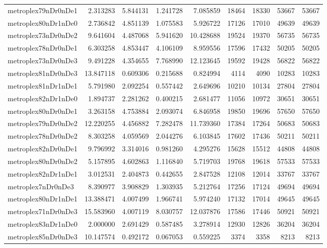 \begin{longtable}{|l|r|r|r|r|r|r|r|r|}
metroplex79nDr0nDe1 & 2.313283 & 5.844131 & 1.241728 & 7.085859 & 18464 & 18330 & 53667 & 53667 \\
metroplex80nDr1nDe0 & 2.736842 & 4.851139 & 1.075583 & 5.926722 & 17126 & 17010 & 49639 & 49639 \\
metroplex73nDr0nDe2 & 9.641604 & 4.487068 & 5.941620 & 10.428688 & 19524 & 19370 & 56735 & 56735 \\
metroplex78nDr0nDe1 & 6.303258 & 4.853447 & 4.106109 & 8.959556 & 17596 & 17432 & 50205 & 50205 \\
metroplex73nDr0nDe3 & 9.491228 & 4.354655 & 7.768990 & 12.123645 & 19592 & 19428 & 56822 & 56822 \\
metroplex81nDr0nDe3 & 13.847118 & 0.609306 & 0.215688 & 0.824994 & 4114 & 4090 & 10283 & 10283 \\
metroplex81nDr1nDe1 & 5.791980 & 2.092254 & 0.557442 & 2.649696 & 10210 & 10134 & 27804 & 27804 \\
metroplex82nDr1nDe0 & 1.894737 & 2.281262 & 0.400215 & 2.681477 & 11056 & 10972 & 30651 & 30651 \\
metroplex80nDr0nDe1 & 3.263158 & 4.753884 & 2.093074 & 6.846958 & 19850 & 19696 & 57650 & 57650 \\
metroplex79nDr0nDe2 & 12.220255 & 4.456882 & 7.282478 & 11.739360 & 17384 & 17264 & 50683 & 50683 \\
metroplex78nDr0nDe2 & 8.303258 & 4.059569 & 2.044276 & 6.103845 & 17602 & 17436 & 50211 & 50211 \\
metroplex82nDr0nDe1 & 9.796992 & 3.314016 & 0.981260 & 4.295276 & 15628 & 15512 & 44808 & 44808 \\
metroplex80nDr0nDe2 & 5.157895 & 4.602863 & 1.116840 & 5.719703 & 19768 & 19618 & 57533 & 57533 \\
metroplex82nDr1nDe1 & 3.012531 & 2.404873 & 0.442655 & 2.847528 & 12108 & 12014 & 33767 & 33767 \\
metroplex7nDr0nDe3 & 8.390977 & 3.908829 & 1.303935 & 5.212764 & 17256 & 17124 & 49694 & 49694 \\
metroplex80nDr1nDe1 & 13.388471 & 4.007499 & 1.966741 & 5.974240 & 17132 & 17014 & 49645 & 49645 \\
metroplex71nDr0nDe3 & 15.583960 & 4.007119 & 8.030757 & 12.037876 & 17586 & 17446 & 50921 & 50921 \\
metroplex83nDr1nDe0 & 2.000000 & 2.691429 & 0.587485 & 3.278914 & 12930 & 12826 & 36204 & 36204 \\
metroplex85nDr0nDe3 & 10.147574 & 0.492172 & 0.067053 & 0.559225 & 3374 & 3358 & 8213 & 8213 \\

\end{longtable}
